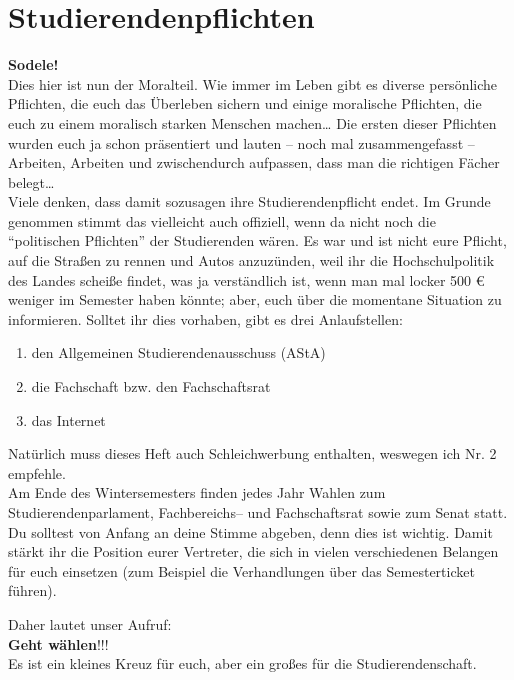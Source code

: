 \section{Studierendenpflichten}

\textbf{Sodele!}\\
Dies hier ist nun der Moralteil.
Wie immer im Leben gibt es diverse persönliche Pflichten, die euch das Überleben sichern
und einige moralische Pflichten, die euch zu einem moralisch starken Menschen machen\ldots
Die ersten dieser Pflichten wurden euch ja schon präsentiert und lauten -- noch mal zusammengefasst --
Arbeiten, Arbeiten und zwischendurch aufpassen, dass man die richtigen Fächer belegt\ldots \\

Viele denken, dass damit sozusagen ihre Studierendenpflicht endet.
Im Grunde genommen stimmt das vielleicht auch offiziell, wenn da nicht noch 
die "`politischen Pflichten"' der Studierenden wären.
Es war und ist nicht eure Pflicht, auf die Straßen zu rennen und Autos anzuzünden, 
weil ihr die Hochschulpolitik des Landes scheiße findet, was ja verständlich ist,
wenn man mal locker 500 \euro{} weniger im Semester haben könnte;
aber, euch über die momentane Situation zu informieren.
Solltet ihr dies vorhaben, gibt es drei Anlaufstellen:

\begin{enumerate}
   \item den Allgemeinen Studierendenausschuss (AStA)
   \item die Fachschaft bzw. den Fachschaftsrat
   \item das Internet
\end{enumerate}

Natürlich muss dieses Heft auch Schleichwerbung enthalten, weswegen ich Nr. 2 empfehle.\\

Am Ende des Wintersemesters finden jedes Jahr Wahlen zum Studierendenparlament,
Fachbereichs-- und Fachschaftsrat sowie zum Senat statt.\\
Du solltest von Anfang an deine Stimme abgeben, denn dies ist wichtig.
Damit stärkt ihr die Position eurer Vertreter, die sich in vielen verschiedenen Belangen für euch einsetzen
(zum Beispiel die Verhandlungen über das Semesterticket führen).

\noindent
Daher lautet unser Aufruf:\\
\textbf{Geht wählen}!!!\\
Es ist ein kleines Kreuz für euch, aber ein großes für die Studierendenschaft.

